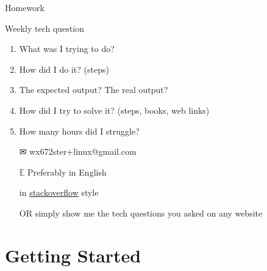 \begin{frame}{Homework}
  \begin{block}{Weekly tech question}
    \begin{enumerate}
    \item What was I trying to do?
    \item How did I do it? (steps)
    \item The expected output? The real output?
    \item How did I try to solve it? (steps, books, web links)
    \item How many hours did I struggle?
    \end{enumerate}
  \end{block}
  \begin{itemize}
  \item[\Large\dejavu ✉] \alert{\ttfamily wx672ster+linux@gmail.com}
  \item[$\mathbb{E}$] Preferably in English
  \item[\stackoverflow] in
    \href{https://stackoverflow.com/questions/39199299/what-is-the-essential-difference-between-compound-command-and-normal-command-inlink}{stackoverflow}
    style
  \item[OR] simply show me the tech questions you asked on any website
  \end{itemize}  
\end{frame}

\begin{frame}
  \begin{center}
  \end{center}
\end{frame}

\section{Getting Started}
\label{sec:start}


